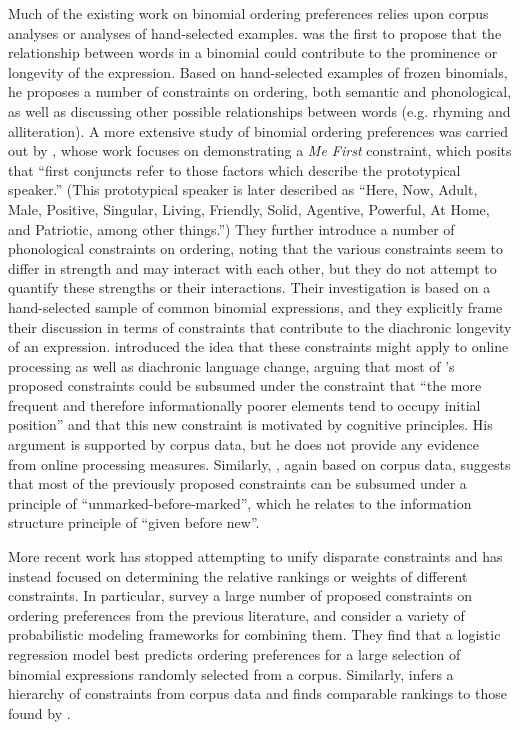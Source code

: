 \documentclass[authoryear]{elsarticle}
\begin{document}
	Much of the existing work on binomial ordering preferences relies upon corpus analyses or analyses of hand-selected examples. \citet{Malkiel:1959vs} was the first to propose that the relationship between words in a binomial could contribute to the prominence or longevity of the expression. Based on hand-selected examples of frozen binomials, he proposes a number of constraints on ordering, both semantic and phonological, as well as discussing other possible relationships between words (e.g. rhyming and alliteration). A more extensive study of binomial ordering preferences was carried out by \citet{Cooper:1975uz}, whose work focuses on demonstrating a \emph{Me First} constraint, which posits that ``first conjuncts refer to those factors which describe the prototypical speaker.'' (This prototypical speaker is later described as ``Here, Now, Adult, Male, Positive, Singular, Living, Friendly, Solid, Agentive, Powerful, At Home, and Patriotic, among other things.'') They further introduce a number of phonological constraints on ordering, noting that the various constraints seem to differ in strength and may interact with each other, but they do not attempt to quantify these strengths or their interactions. Their investigation is based on a hand-selected sample of common binomial expressions, and they explicitly frame their discussion in terms of constraints that contribute to the diachronic longevity of an expression. \citet{FenkOczlon:1989uq} introduced the idea that these constraints might apply to online processing as well as diachronic language change, arguing that most of \citeauthor{Cooper:1975uz}'s proposed constraints could be subsumed under the constraint that ``the more frequent and therefore informationally poorer elements tend to occupy initial position'' and that this new constraint is motivated by cognitive principles. His argument is supported by corpus data, but he does not provide any evidence from online processing measures. Similarly, \citet{Sobkowiak:1993ir}, again based on corpus data, suggests that most of the previously proposed constraints can be subsumed under a principle of ``unmarked-before-marked'', which he relates to the information structure principle of ``given before new''.
	
	More recent work has stopped attempting to unify disparate constraints and has instead focused on determining the relative rankings or weights of different constraints. In particular, \citet{Benor:2006gv} survey a large number of proposed constraints on ordering preferences from the previous literature, and consider a variety of probabilistic modeling frameworks for combining them. They find that a logistic regression model best predicts ordering preferences for a large selection of binomial expressions randomly selected from a corpus. Similarly, \citet{MOLLIN:2012ia} infers a hierarchy of constraints from corpus data and finds comparable rankings to those found by \citeauthor{Benor:2006gv}.
\end{document}
